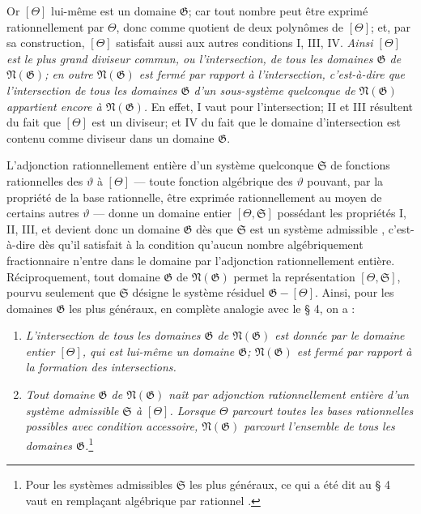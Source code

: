 Or $[\Theta]$ lui-même est un domaine $\mathfrak G$; car tout nombre peut être exprimé rationnellement par $\Theta$, donc comme quotient de deux polynômes de $[\Theta]$; et, par sa construction, $[\Theta]$ satisfait aussi aux autres conditions I, III, IV. \emph{Ainsi $[\Theta]$ est le plus grand diviseur commun, ou l'intersection, de tous les domaines $\mathfrak G$ de $\mathfrak N(\mathfrak G)$; en outre $\mathfrak N(\mathfrak G)$ est fermé par rapport à l'intersection, c'est-à-dire que l'intersection de tous les domaines $\mathfrak G$ d'un sous-système quelconque de $\mathfrak N(\mathfrak G)$ appartient encore à $\mathfrak N(\mathfrak G)$.} En effet, I vaut pour l'intersection; II et III résultent du fait que $[\Theta]$ est un diviseur; et IV du fait que le domaine d'intersection est contenu comme diviseur dans un domaine $\mathfrak G$.

L'adjonction rationnellement entière d'un système quelconque $\mathfrak S$ de fonctions rationnelles des $\vartheta$ à $[\Theta]$ --- toute fonction algébrique des $\vartheta$ pouvant, par la propriété de la base rationnelle, être exprimée rationnellement au moyen de certains autres $\vartheta$ --- donne un domaine entier $[\Theta,\mathfrak S]$ possédant les propriétés I, II, III, et devient donc un domaine $\mathfrak G$ dès que $\mathfrak S$ est un \og{} système admissible \fg{}, c'est-à-dire dès qu'il satisfait à la condition qu'aucun nombre algébriquement fractionnaire n'entre dans le domaine par l'adjonction rationnellement entière. Réciproquement, tout domaine $\mathfrak G$ de $\mathfrak N(\mathfrak G)$ permet la représentation $[\Theta,\mathfrak S]$, pourvu seulement que $\mathfrak S$ désigne le système résiduel $\mathfrak G-[\Theta]$. Ainsi, pour les domaines $\mathfrak G$ les plus généraux, en complète analogie avec le \S{} 4, on a :
\begin{enumerate}
\item[a)] \emph{L'intersection de tous les domaines $\mathfrak G$ de $\mathfrak N(\mathfrak G)$ est donnée par le domaine entier $[\Theta]$, qui est lui-même un domaine $\mathfrak G$; $\mathfrak N(\mathfrak G)$ est fermé par rapport à la formation des intersections.}
\item[b)] \emph{Tout domaine $\mathfrak G$ de $\mathfrak N(\mathfrak G)$ naît par adjonction rationnellement entière d'un système admissible $\mathfrak S$ à $[\Theta]$. Lorsque $\Theta$ parcourt toutes les bases rationnelles possibles avec condition accessoire, $\mathfrak N(\mathfrak G)$ parcourt l'ensemble de tous les domaines $\mathfrak G$.}\footnote{Pour les systèmes admissibles $\mathfrak S$ les plus généraux, ce qui a été dit au \S{} 4 vaut en remplaçant \og{} algébrique \fg{} par \og{} rationnel \fg{}.}
\end{enumerate}

